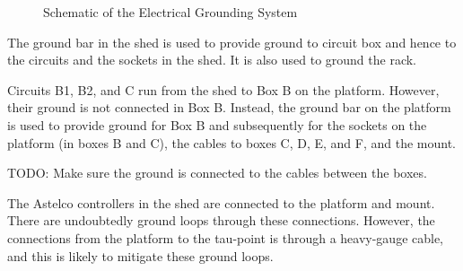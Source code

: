 \begin{figure*}
\begin{center}
{
}
\end{center}
\caption{Schematic of the Electrical Grounding System}
\label{figure:schematic-electrical-grounding-system}
\end{figure*}

The ground bar in the shed is used to provide ground to circuit box and hence to the circuits and the sockets in the shed. It is also used to ground the rack.

Circuits B1, B2, and C run from the shed to Box B on the platform. However, their ground is not connected in Box B. Instead, the ground bar on the platform is used to provide ground for Box B and subsequently for the sockets on the platform (in boxes B and C), the cables to boxes C, D, E, and F, and the mount.

TODO: Make sure the ground is connected to the cables between the boxes.

The Astelco controllers in the shed are connected to the platform and mount. There are undoubtedly ground loops through these connections. However, the connections from the platform to the tau-point is through a heavy-gauge cable, and this is likely to mitigate these ground loops.

\ifcoatli

